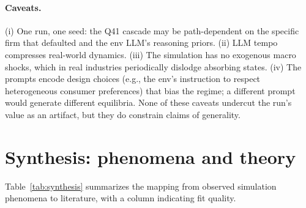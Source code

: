 \documentclass[11pt]{article}
\begin{document}
\paragraph{Caveats.} (i) One run, one seed: the Q41 cascade may be path-dependent on the specific firm that defaulted and the env LLM's reasoning priors. (ii) LLM tempo compresses real-world dynamics. (iii) The simulation has no exogenous macro shocks, which in real industries periodically dislodge absorbing states. (iv) The prompts encode design choices (e.g., the env's instruction to respect heterogeneous consumer preferences) that bias the regime; a different prompt would generate different equilibria. None of these caveats undercut the run's value as an artifact, but they do constrain claims of generality.

\section{Synthesis: phenomena and theory}

Table~\ref{tab:synthesis} summarizes the mapping from observed simulation phenomena to literature, with a column indicating fit quality.
\end{document}

